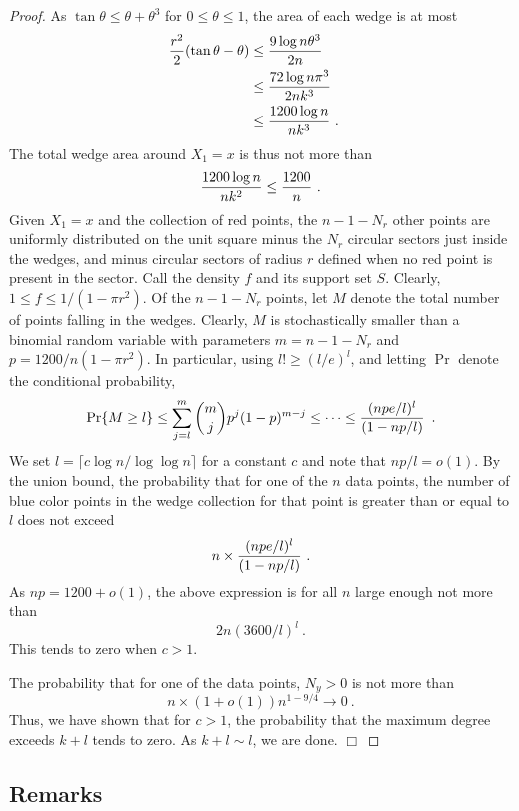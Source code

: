 \documentclass[10pt]{llncs}
\newcommand{\PROB}{\Pr}
\begin{document}
\begin{proof}
As $\tan \theta \le \theta + \theta^3$ for $0 \le \theta \le 1$,
the area of each wedge is at most
\[
\begin{aligned}
{ r^2 \over 2} (\tan \theta - \theta)
&\le { 9 \log n \theta^3 \over 2n}  \cr
&\le { 72 \log n \pi^3 \over 2nk^3}  \cr
&\le { 1200 \log n \over n k^3} ~. \cr
\end{aligned}
\]
The total wedge area around $X_1 = x$ is thus not more
than
\[
{ 1200 \log n \over n k^2 } \le { 1200 \over n }~.
\]
Given $X_1 = x$ and the collection of red points,
the $n-1-N_r$ other points are uniformly distributed
on the unit square minus the $N_r$ circular
sectors just inside the wedges, and minus 
circular sectors of radius $r$ defined when no
red point is present in the sector. Call the density $f$
and its support set $S$. Clearly, 
$1 \le f 
\le 1/(1-\pi r^2)$.
Of the $n-1-N_r$ points, let $M$ denote the total
number of points falling in the wedges.
Clearly, $M$ is stochastically smaller
than a binomial random variable with parameters
$m = n-1-N_r$ and $p = 1200/n(1-\pi r^2)$.
In particular, using $l! \ge (l/e)^l$,
and letting $\PROB$ denote the conditional probability,
\[
\PROB \{ M \ge l \}
\le \sum_{j=l}^m {m \choose j} p^j (1-p)^{m-j} 
\le \cdots
\le   {(npe/l)^l \over (1-np/l)} \enspace . 
\]
We set $l = \lceil c \log n / \log \log n \rceil$ for a constant $c$
and note that $np/l = o(1)$.
By the union bound, 
the probability that for one of the $n$ data points,
the number of blue color points in the wedge collection
for that point is greater than or equal to $l$ does not
exceed 
\[
n \times {(npe/l)^l \over (1-np/l)} ~. 
\]
As $np = 1200+o(1)$, the above expression is for all $n$
large enough not more than
\[
2n (3600/l)^l~.
\]
This tends to zero when $c > 1$.

The probability that for one of the data points,
$N_y > 0$ is not more than
\[
n \times (1+o(1)) n^{1-9/4} \to 0~.
\]
Thus, we have shown that for $c > 1$, 
the probability that the maximum degree
exceeds $k+l$ tends to zero. As $k+l \sim l$, we are done.
\hfill$\Box$\end{proof}

\subsection{Remarks}
\end{document}
